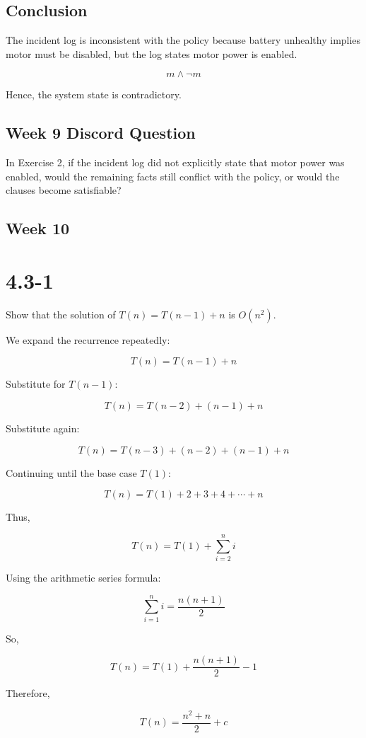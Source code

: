 \documentclass{article}
\theoremstyle{theorem}
\theoremstyle{definition}
\theoremstyle{remark}
\begin{document}
\subsection*{Conclusion}

The incident log is inconsistent with the policy because battery unhealthy implies motor must be disabled, but the log states motor power is enabled.

\[
m\land \neg m
\]

Hence, the system state is contradictory.

\subsection*{Week 9 Discord Question}
In Exercise 2, if the incident log did not explicitly state that motor power was enabled, would the remaining facts still conflict with the policy, or would the clauses become satisfiable?

\subsection{Week 10}

\section*{4.3-1}

Show that the solution of $T(n)=T(n-1)+n$ is $O(n^2)$.

We expand the recurrence repeatedly:

\[
T(n)=T(n-1)+n
\]

Substitute for $T(n-1)$:

\[
T(n)=T(n-2)+(n-1)+n
\]

Substitute again:

\[
T(n)=T(n-3)+(n-2)+(n-1)+n
\]

Continuing until the base case $T(1)$:

\[
T(n)=T(1)+2+3+4+\cdots+n
\]

Thus,

\[
T(n)=T(1)+\sum_{i=2}^{n} i
\]

Using the arithmetic series formula:

\[
\sum_{i=1}^{n} i=\frac{n(n+1)}{2}
\]

So,

\[
T(n)=T(1)+\frac{n(n+1)}{2}-1
\]

Therefore,

\[
T(n)=\frac{n^2+n}{2}+c
\]
\end{document}

